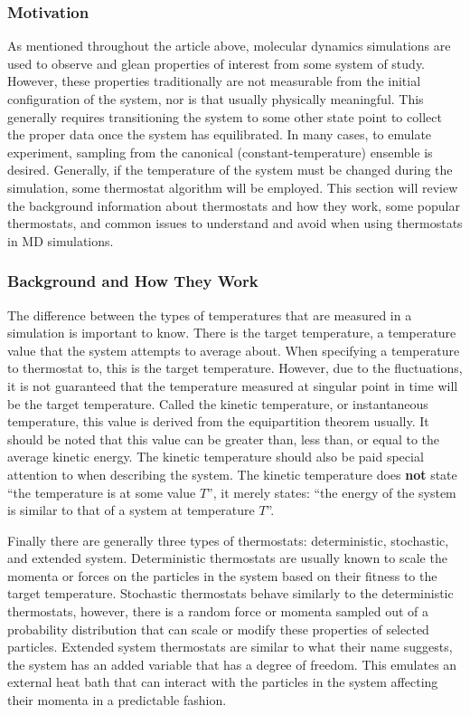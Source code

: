 \documentclass[9pt,bestpractices]{livecoms}
\begin{document}
\subsubsection{Motivation}
As mentioned throughout the article above, molecular dynamics simulations are used to observe and glean properties of interest from some system of
study.
However, these properties traditionally are not measurable from the initial configuration of the system, nor is that usually physically meaningful.
This generally requires transitioning the system to some other state point to collect the proper data once the system has equilibrated.
In many cases, to emulate experiment, sampling from the canonical (constant-temperature) ensemble is desired\cite{thermostatAlgorithms2005}.
Generally, if the temperature of the system must be changed during the simulation, some thermostat algorithm will be employed. 
This section will review the background information about thermostats and how they work, some popular thermostats, and common issues to understand and avoid when using thermostats in MD simulations.

\subsubsection{Background and How They Work}
The difference between the types of temperatures that are measured in a simulation is important to know.
There is the target temperature, a temperature value that the system attempts to average about.
When specifying a temperature to thermostat to, this is the target temperature.
However, due to the fluctuations, it is not guaranteed that the temperature measured at singular point in time will be the target temperature.
Called the kinetic temperature, or instantaneous temperature, this value is derived from the equipartition theorem usually.
It should be noted that this value can be greater than, less than, or equal to the average kinetic energy.
The kinetic temperature should also be paid special attention to when describing the system.
The kinetic temperature does \textbf{not} state ``the temperature is at some value $T$'', it merely states: ``the energy of the system is similar to that
of a system at temperature $T$''.

Finally there are generally three types of thermostats: deterministic, stochastic, and extended system.
Deterministic thermostats are usually known to scale the momenta or forces on the particles in the system based on their fitness to the target temperature.
Stochastic thermostats behave similarly to the deterministic thermostats, however, there is a random force or momenta sampled out of a probability distribution that can scale or modify these properties of selected particles.
Extended system thermostats are similar to what their name suggests, the system has an added variable that has a degree of freedom.
This emulates an external heat bath that can interact with the particles in the system affecting their momenta in a predictable fashion.
\end{document}
